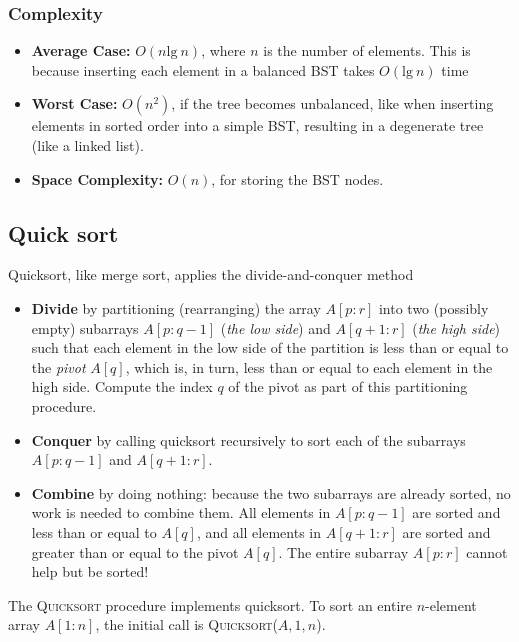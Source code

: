 \documentclass{report}
\begin{document}
\bigbreak \noindent 
\subsubsection{Complexity}
\bigbreak \noindent 
\begin{itemize}
    \item \textbf{Average Case:} $O(n\text{lg}\ n)$, where $n$ is the number of elements. This is because inserting each element in a balanced BST takes $O(\text{lg}\ n)$ time
    \item \textbf{Worst Case:} $O(n^{2})$, if the tree becomes unbalanced, like when inserting elements in sorted order into a simple BST, resulting in a degenerate tree (like a linked list).
    \item \textbf{Space Complexity:} $O(n)$, for storing the BST nodes.
\end{itemize}

\pagebreak 
\subsection{Quick sort}
\bigbreak \noindent 
Quicksort, like merge sort, applies the divide-and-conquer method
\bigbreak \noindent 
\begin{itemize}
    \item \textbf{Divide} by partitioning (rearranging) the array \( A[p : r] \) into two (possibly empty) subarrays \( A[p : q - 1] \) (\textit{the low side}) and \( A[q + 1 : r] \) (\textit{the high side}) such that each element in the low side of the partition is less than or equal to the \textit{pivot} \( A[q] \), which is, in turn, less than or equal to each element in the high side. Compute the index \( q \) of the pivot as part of this partitioning procedure.
    \item \textbf{Conquer} by calling quicksort recursively to sort each of the subarrays \( A[p : q - 1] \) and \( A[q + 1 : r] \).
    \item \textbf{Combine} by doing nothing: because the two subarrays are already sorted, no work is needed to combine them. All elements in \( A[p : q - 1] \) are sorted and less than or equal to \( A[q] \), and all elements in \( A[q + 1 : r] \) are sorted and greater than or equal to the pivot \( A[q] \). The entire subarray \( A[p : r] \) cannot help but be sorted!
\end{itemize}
The \textsc{Quicksort} procedure implements quicksort. To sort an entire \( n \)-element array \( A[1 : n] \), the initial call is \textsc{Quicksort}(\( A, 1, n \)).
\bigbreak \noindent 
\end{document}
